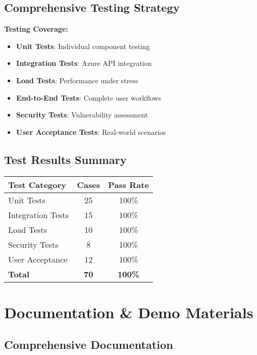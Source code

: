 \documentclass[11pt]{article}
\begin{document}
\subsection*{Comprehensive Testing Strategy}

\begin{techbox}
\textbf{Testing Coverage:}
\begin{itemize}
    \item \textbf{Unit Tests}: Individual component testing
    \item \textbf{Integration Tests}: Azure API integration
    \item \textbf{Load Tests}: Performance under stress
    \item \textbf{End-to-End Tests}: Complete user workflows
    \item \textbf{Security Tests}: Vulnerability assessment
    \item \textbf{User Acceptance Tests}: Real-world scenarios
\end{itemize}
\end{techbox}

\subsection*{Test Results Summary}

\begin{center}
\begin{tabular}{|l|c|c|}
\hline
\textbf{Test Category} & \textbf{Cases} & \textbf{Pass Rate} \\
\hline
Unit Tests & 25 & 100\% \\
Integration Tests & 15 & 100\% \\
Load Tests & 10 & 100\% \\
Security Tests & 8 & 100\% \\
User Acceptance & 12 & 100\% \\
\hline
\textbf{Total} & \textbf{70} & \textbf{100\%} \\
\hline
\end{tabular}
\end{center}

\section*{Documentation \& Demo Materials}

\subsection*{Comprehensive Documentation}
\end{document}
